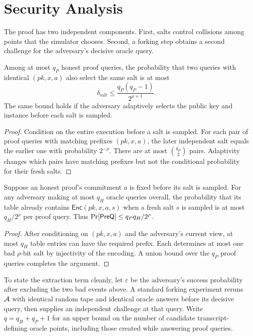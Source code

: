 \section{Security Analysis}
\label{sec:security}

The proof has two independent components.  First, salts control collisions
among points that the simulator chooses.  Second, a forking step obtains a
second challenge for the adversary's decisive oracle query.

\begin{lemma}
  \label{lem:collision}
  Among at most $q_P$ honest proof queries, the probability that two queries
  with identical $(pk,x,a)$ also select the same salt is at most
  \[
     \delta_{\mathrm{salt}} \le \frac{q_P(q_P-1)}{2^{\rho+1}}.
  \]
  The same bound holds if the adversary adaptively selects the public key and
  instance before each salt is sampled.
\end{lemma}

\begin{proof}
  Condition on the entire execution before a salt is sampled.  For each pair
  of proof queries with matching prefixes $(pk,x,a)$, the later independent
  salt equals the earlier one with probability $2^{-\rho}$.  There are at most
  $\binom{q_P}{2}$ pairs.  Adaptivity changes which pairs have matching
  prefixes but not the conditional probability for their fresh salts.
\end{proof}

\begin{lemma}
  \label{lem:prequery}
  Suppose an honest proof's commitment $a$ is fixed before its salt is sampled.
  For any adversary making at most $q_H$ oracle queries overall, the probability
  that its table already contains
  $\mathsf{Enc}(pk,x,a,s)$ when a fresh salt $s$ is sampled is at most
  $q_H/2^\rho$ per proof query.  Thus
  $\Pr[\mathsf{PreQ}]\le q_Pq_H/2^\rho$.
\end{lemma}

\begin{proof}
  After conditioning on $(pk,x,a)$ and the adversary's current view, at most
  $q_H$ table entries can have the required prefix.  Each determines at most
  one bad $\rho$-bit salt by injectivity of the encoding.  A union bound over
  the $q_P$ proof queries completes the argument.
\end{proof}

To state the extraction term cleanly, let $\varepsilon$ be the adversary's
success probability after excluding the two bad events above.  A standard
forking experiment reruns $\mathcal{A}$ with identical random tape and identical
oracle answers before its decisive query, then supplies an independent
challenge at that query.  Write $q=q_H+q_P+1$ for an upper bound on the number
of candidate transcript-defining oracle points, including those created while
answering proof queries.

